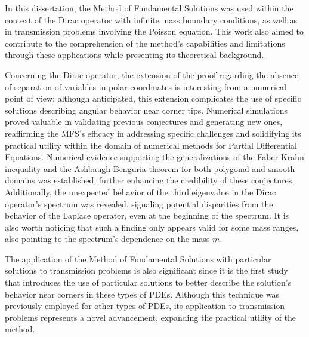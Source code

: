 \label{chap:conclusion}

In this dissertation, the Method of Fundamental Solutions was used within the context of the Dirac operator with infinite mass boundary conditions, as well as in transmission problems involving the Poisson equation. This work also aimed to contribute to the comprehension of the method's capabilities and limitations through these applications while presenting its theoretical background.

Concerning the Dirac operator, the extension of the proof regarding the absence of separation of variables in polar coordinates is interesting from a numerical point of view: although anticipated, this extension complicates the use of specific solutions describing angular behavior near corner tips. Numerical simulations proved valuable in validating previous conjectures and generating new ones, reaffirming the \ac{MFS}'s efficacy in addressing specific challenges and solidifying its practical utility within the domain of numerical methods for Partial Differential Equations. Numerical evidence supporting the generalizations of the Faber-Krahn inequality and the Ashbaugh-Benguria theorem for both polygonal and smooth domains was established, further enhancing the credibility of these conjectures. Additionally, the unexpected behavior of the third eigenvalue in the Dirac operator's spectrum was revealed, signaling potential disparities from the behavior of the Laplace operator, even at the beginning of the spectrum. It is also worth noticing that such a finding only appears valid for some mass ranges, also pointing to the spectrum's dependence on the mass \(m\).

The application of the Method of Fundamental Solutions with particular solutions to transmission problems is also significant since it is the first study that introduces the use of particular solutions to better describe the solution's behavior near corners in these types of \acp{PDE}. Although this technique was previously employed for other types of \acp{PDE}, its application to transmission problems represents a novel advancement, expanding the practical utility of the method.

